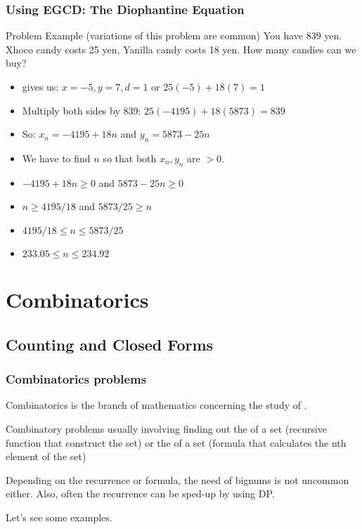 \documentclass{beamer}
\begin{document}
\begin{frame}
  \frametitle{Using EGCD: The Diophantine Equation}
  {\smaller
    \begin{block}{Problem Example (variations of this problem are common)}
      You have 839 yen. \alert{X}hoco candy costs 25 yen,
      \alert{Y}anilla candy costs 18 yen. How many candies can we buy?
    \end{block}
   
    \begin{itemize}
    \item {} gives us: $x=-5, y=7, d=1$ or $25(-5)+18(7) = 1$
    \item Multiply both sides by 839: $25(-4195)+18(5873) = 839$
    \item So: $x_n = -4195 + 18n$ and $y_n = 5873 - 25n$
    \item We have to find $n$ so that both $x_n,y_n$ are $> 0$.
    \item $-4195 + 18n \geq 0$ and $5873 - 25n \geq 0$
    \item $n \geq 4195/18$ and $5873/25 \geq n$
    \item $4195/18 \leq n \leq 5873/25$
    \item $233.05 \leq n \leq 234.92$
    \end{itemize} 
  }
\end{frame}


\section{Combinatorics}
\subsection{Counting and Closed Forms}
\begin{frame}
  \frametitle{Combinatorics problems} 

  Combinatorics is the branch of mathematics concerning the study of
  .

  Combinatory problems usually involving finding out the
   of a set (recursive function that construct
  the set) or the  of a set (formula that
  calculates the nth element of the set)

  Depending on the recurrence or formula, the need of bignums is not
  uncommon either. Also, often the recurrence can be sped-up by using
  DP.

  Let's see some examples.  
\end{frame}
\end{document}
